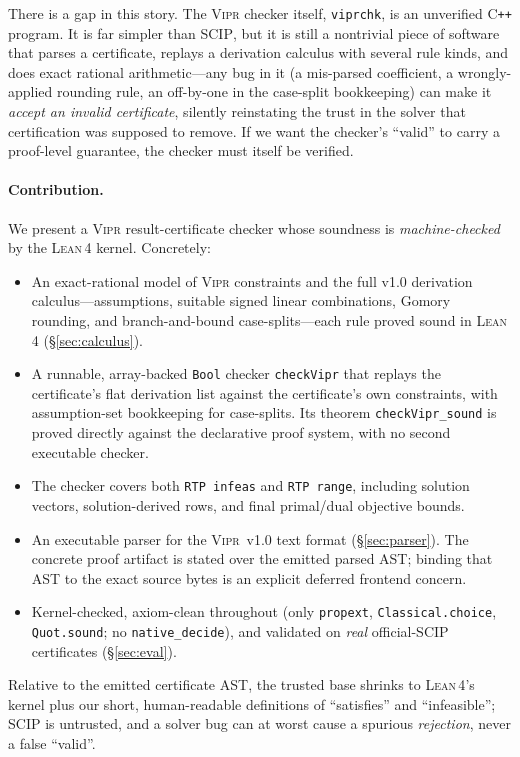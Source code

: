 \documentclass[runningheads]{llncs}
\newcommand{\code}[1]{\texttt{#1}}
\newcommand{\scip}{\textsc{SCIP}}
\newcommand{\vipr}{\textsc{Vipr}}
\newcommand{\lean}{\textsc{Lean\,4}}
\begin{document}
There is a gap in this story. The \vipr{} checker itself, \code{viprchk}, is an
unverified C\texttt{++} program. It is far simpler than \scip{}, but it is still a
nontrivial piece of software that parses a certificate, replays a derivation calculus
with several rule kinds, and does exact rational arithmetic---any bug in it (a
mis-parsed coefficient, a wrongly-applied rounding rule, an off-by-one in the
case-split bookkeeping) can make it \emph{accept an invalid certificate}, silently
reinstating the trust in the solver that certification was supposed to remove. If we
want the checker's ``valid'' to carry a proof-level guarantee, the checker must itself be
verified.

\paragraph{Contribution.} We present a \vipr{} result-certificate checker whose
soundness is \emph{machine-checked} by the \lean{} kernel. Concretely:
\begin{itemize}
\item An exact-rational model of \vipr{} constraints and the full v1.0 derivation
      calculus---assumptions, suitable signed linear combinations, Gomory rounding, and
      branch-and-bound case-splits---each rule proved sound in \lean{}
      (\S\ref{sec:calculus}).
\item A runnable, array-backed \code{Bool} checker \code{checkVipr} that replays
      the certificate's flat derivation list against the certificate's own constraints,
      with assumption-set bookkeeping for case-splits. Its theorem
      \code{checkVipr\_sound} is proved directly against the declarative proof
      system, with no second executable checker.
\item The checker covers both \code{RTP infeas} and
      \code{RTP range}, including solution vectors, solution-derived rows, and final
      primal/dual objective bounds.
\item An executable parser for the \vipr~v1.0 text format (\S\ref{sec:parser}). The
      concrete proof artifact is stated over the emitted parsed AST; binding that AST
      to the exact source bytes is an explicit deferred frontend concern.
\item Kernel-checked, axiom-clean throughout (only \code{propext},
      \code{Classical.choice}, \code{Quot.sound}; no \code{native\_decide}), and
      validated on \emph{real} official-\scip{} certificates (\S\ref{sec:eval}).
\end{itemize}
Relative to the emitted certificate AST, the trusted base shrinks to \lean{}'s kernel
plus our short, human-readable definitions of ``satisfies'' and ``infeasible'';
\scip{} is untrusted, and a solver bug can at worst cause a spurious
\emph{rejection}, never a false ``valid''.
\end{document}

